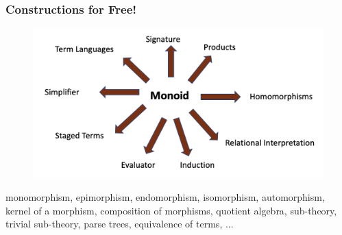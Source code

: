 \documentclass[t,10pt,numbers,fleqn,usenames,xcolor=dvipsnames]{beamer}
\begin{document}
\begin{frame}[fragile] 
\frametitle{Constructions for Free!} 
\begin{figure}
\includegraphics[scale=0.25]{figures/monoid_generation2.png}
\end{figure}
\scriptsize
monomorphism, epimorphism, endomorphism, isomorphism, automorphism, kernel of a morphism, composition of morphisms, quotient algebra, sub-theory, trivial sub-theory, parse trees, equivalence of terms, ...   
\end{frame}

\end{document}
